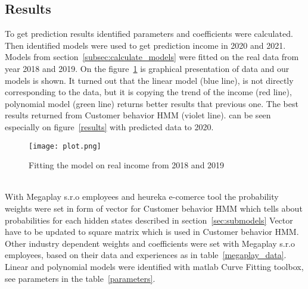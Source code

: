 \subsection{Results} \label{experimentResults}
To get prediction results identified parameters and coefficients were calculated.
Then identified models were used to get prediction income in 2020 and 2021.
Models from section~\ref{subsec:calculate_models} were fitted on the real data from year 2018 and 2019.
On the figure~\ref{plot} is graphical presentation of data and our models is shown.
It turned out that the linear model (blue line), is not directly corresponding to the data, but it is copying the trend of the income (red line),
polynomial model (green line) returns better results that previous one.
The best results returned from Customer behavior HMM (violet line).
can be seen especially on figure~\ref{results} with predicted data to 2020.
\begin{figure}[h!]
    \begin{center}
        \texttt{[image: plot.png]}
    \end{center}
    \caption{Fitting the model on real income from 2018 and 2019}
    \label{plot}
\end{figure}\\
With Megaplay s.r.o employees and heureka e-comerce tool the probability weights were set in form of vector for
Customer behavior HMM which tells about probabilities for each hidden states described in section~\ref{sec:submodels}
Vector have to be updated to square matrix which is used in Customer behavior HMM.
Other industry dependent weights and coefficients were set with Megaplay s.r.o employees, based on their data and experiences as in table~\ref{megaplay_data}.\\
Linear and polynomial models were identified with matlab Curve Fitting toolbox, see parameters in the table~\ref{parameters}.
\newpage
